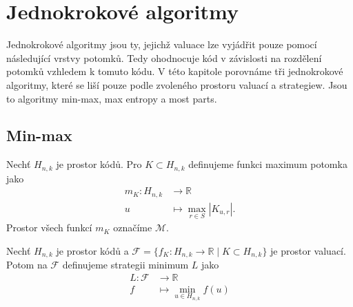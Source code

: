 
\chapter{Jednokrokové algoritmy}
Jednokrokové algoritmy jsou ty, jejichž valuace lze vyjádřit pouze pomocí následující vrstvy potomků. Tedy ohodnocuje kód v závislosti na rozdělení potomků vzhledem k tomuto kódu. V této kapitole porovnáme tři jednokrokové algoritmy, které se liší pouze podle zvoleného prostoru valuací a strategiew. Jsou to algoritmy min-max, max entropy a most parts. 





\section{Min-max}
\begin{definice}
    Nechť $H_{n,k}$ je prostor kódů. Pro $K \subset H_{n,k}$ definujeme funkci maximum potomka jako
    \begin{align*}
        m_K \colon H_{n,k} &\to \mathbb{R} \\
        u &\mapsto \max_{r\in S} |K_{u,r}|.
    \end{align*}
    Prostor všech funkcí $m_K$ označíme $\mathcal{M}$. 
\end{definice}

\begin{definice}
    Nechť $H_{n,k}$ je prostor kódů a $\mathcal{F} = \{f_K\colon H_{n,k} \to \mathbb{R} \mid K \subset H_{n,k}\}$ je prostor valuací. Potom na $\mathcal{F}$ definujeme strategii minimum $L$ jako
    \begin{align*}
        L \colon \mathcal{F} &\to \mathbb{R} \\
        f &\mapsto \min_{u\in H_{n,k}} f(u)
    \end{align*}
\end{definice}

